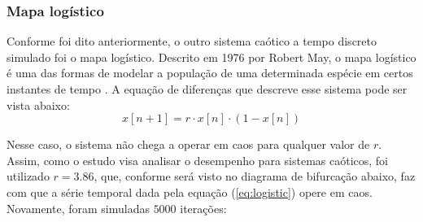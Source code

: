 \documentclass[9pt, technote]{article}
\begin{document}
\subsubsection{Mapa logístico}

Conforme foi dito anteriormente, o outro sistema caótico a tempo discreto simulado foi o mapa logístico. Descrito em 1976 por Robert May, o mapa logístico é uma das formas de modelar a população de uma determinada espécie em certos instantes de tempo \cite{may1976simple}. A equação de diferenças que descreve esse sistema pode ser vista abaixo:
\begin{equation}\label{eq:logistic}
x[n+1] = r\cdot x[n] \cdot (1 - x[n])
\end{equation}

Nesse caso, o sistema não chega a operar em caos para qualquer valor de $r$. Assim, como o estudo visa analisar o desempenho para sistemas caóticos, foi utilizado $r=3.86$, que, conforme será visto no diagrama de bifurcação abaixo, faz com que a série temporal dada pela equação (\ref{eq:logistic}) opere em caos. Novamente, foram simuladas $5000$ iterações:
\end{document}
